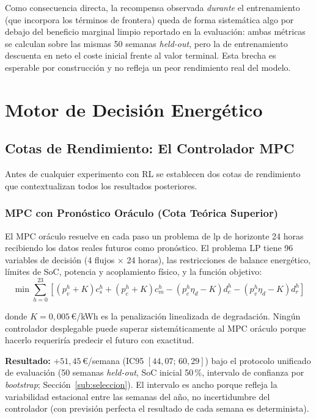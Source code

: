 \documentclass[12pt, a4paper, twoside]{report}
\begin{document}
Como consecuencia directa, la recompensa observada \emph{durante} el entrenamiento
(que incorpora los términos de frontera) queda de forma sistemática algo por debajo
del beneficio marginal limpio reportado en la evaluación: ambas métricas se calculan
sobre las mismas 50 semanas \textit{held-out}, pero la de entrenamiento descuenta en
neto el coste inicial frente al valor terminal. Esta brecha es esperable por
construcción y no refleja un peor rendimiento real del modelo.

\section{Motor de Decisión Energético}
\label{sec:motor}

\subsection{Cotas de Rendimiento: El Controlador MPC}
\label{sub:mpc}

Antes de cualquier experimento con RL se establecen dos cotas de rendimiento
que contextualizan todos los resultados posteriores.

\subsubsection{MPC con Pronóstico Oráculo (Cota Teórica Superior)}

El MPC oráculo resuelve en cada paso un problema de \acrshort{lp} de horizonte
24 horas recibiendo los datos reales futuros como pronóstico. El problema LP
tiene 96 variables de decisión (4 flujos $\times$ 24 horas), las restricciones
de balance energético, límites de SoC, potencia y acoplamiento físico, y la
función objetivo:
\begin{equation}
\min \sum_{h=0}^{23}\!\left[
  (p_v^h+K)c_s^h + (p_c^h+K)c_m^h
  - (p_c^h\eta_d-K)d_c^h - (p_v^h\eta_d-K)d_r^h
\right]
\label{eq:mpc_obj}
\end{equation}

donde $K = 0{,}005$\,€/kWh es la penalización linealizada de degradación.
Ningún controlador desplegable puede superar sistemáticamente al MPC oráculo
porque hacerlo requeriría predecir el futuro con exactitud.

\textbf{Resultado:} $+51{,}45$\,€/semana (IC95 $[44{,}07;\,60{,}29]$) bajo el
protocolo unificado de evaluación (50 semanas \textit{held-out}, SoC inicial
50\,\%, intervalo de confianza por \textit{bootstrap};
Sección~\ref{sub:seleccion}). El intervalo es ancho porque refleja la
variabilidad estacional entre las semanas del año, no incertidumbre del
controlador (con previsión perfecta el resultado de cada semana es
determinista).
\end{document}
